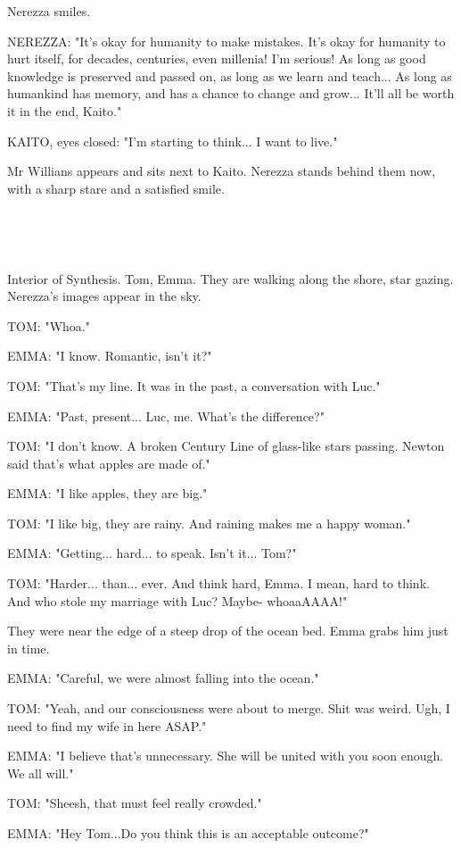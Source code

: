\documentclass[11pt]{article}
\begin{document}
Nerezza smiles.

NEREZZA: "It's okay for humanity to make mistakes.
It's okay for humanity to hurt itself, for decades, centuries, even millenia!
I'm serious!
As long as good knowledge is preserved and passed on, as long as we learn and teach...
As long as humankind has memory, and has a chance to change and grow...
It'll all be worth it in the end, Kaito."

KAITO, eyes closed: "I'm starting to think...
I want to live."

Mr Willians appears and sits next to Kaito.
Nerezza stands behind them now, with a sharp stare and a satisfied smile.

\ 

\ 

Interior of Synthesis.
Tom, Emma.
They are walking along the shore, star gazing.
Nerezza's images appear in the sky.

TOM: "Whoa."

EMMA: "I know. Romantic, isn't it?"

TOM: "That's my line.
It was in the past, a conversation with Luc."

EMMA: "Past, present... Luc, me. What's the difference?"

TOM: "I don't know. 
A broken Century Line of glass-like stars passing.
Newton said that's what apples are made of."

EMMA: "I like apples, they are big."

TOM: "I like big, they are rainy.
And raining makes me a happy woman."

EMMA: "Getting... hard... to speak. 
Isn't it... Tom?"

TOM: "Harder... than... ever.
And think hard, Emma.
I mean, hard to think.
And who stole my marriage with Luc?
Maybe- whoaaAAAA!"

They were near the edge of a steep drop of the ocean bed. 
Emma grabs him just in time.

EMMA: "Careful, we were almost falling into the ocean."

TOM: "Yeah, and our consciousness were about to merge. 
Shit was weird.
Ugh, I need to find my wife in here ASAP."

EMMA: "I believe that's unnecessary. 
She will be united with you soon enough.
We all will."

TOM: "Sheesh, that must feel really crowded."

EMMA: "Hey Tom...Do you think this is an acceptable outcome?"
\end{document}
